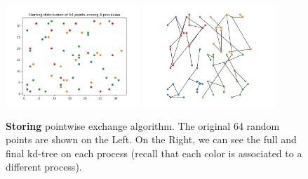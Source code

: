 \documentclass[amssymb, aps,nofootinbib, superscriptaddress, notitlepage]{revtex4}
\begin{document}
\begin{figure}
  \centering
      \includegraphics[width=0.45\textwidth]{img/Starting_64.png}
            \includegraphics[width=0.45\textwidth]{img/mpistore64.png}
 \caption{\textbf{Storing} pointwise exchange algorithm. 
 The original 64 random points are shown on the Left. 
On the Right, we can see the full and final kd-tree on each process (recall that each color is associated to a different process). }
\label{P2P_S}
\end{figure}
\end{document}
